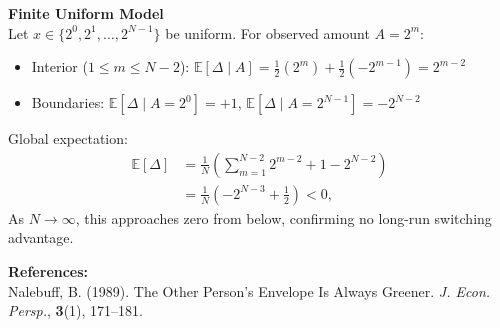 \begin{technical}
\textbf{Finite Uniform Model}\\[0.2em]
Let $x \in \{2^0, 2^1, \dots, 2^{N-1}\}$ be uniform. For observed amount $A = 2^m$:
\begin{itemize}[topsep=0pt,itemsep=2pt]
\item Interior ($1 \le m \le N - 2$): $\mathbb{E}[\Delta \mid A] = \tfrac{1}{2}(2^m) + \tfrac{1}{2}(-2^{m-1}) = 2^{m-2}$
\item Boundaries: $\mathbb{E}[\Delta \mid A = 2^0] = +1$, $\mathbb{E}[\Delta \mid A = 2^{N-1}] = -2^{N-2}$
\end{itemize}
Global expectation:
\begin{align}
\mathbb{E}[\Delta] &= \frac{1}{N} \left( \sum_{m=1}^{N-2} 2^{m-2} + 1 - 2^{N-2} \right) \\
&= \frac{1}{N} \left( -2^{N-3} + \tfrac{1}{2} \right) < 0,
\end{align}
As $N \to \infty$, this approaches zero from below, confirming no long-run switching advantage.

\textbf{References:}\\
Nalebuff, B. (1989). The Other Person's Envelope Is Always Greener. \textit{J. Econ. Persp.}, \textbf{3}(1), 171--181.
\end{technical}
